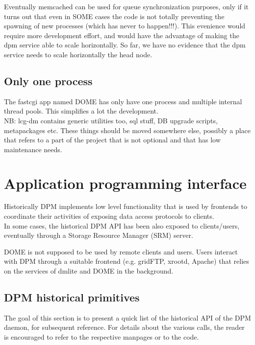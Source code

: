 \documentclass[a4paper,10pt]{scrreprt}
\begin{document}
Eventually memcached can be used for queue synchronization purposes, only if it turns out that even in SOME cases the code is not totally
preventing the spawning of new processes (which has never to happen!!!). This evenience would require more development effort, and would have the
advantage of making the dpm service able to scale horizontally. So far, we have no evidence that the dpm service needs to scale horizontally the head node.\\

\subsection{Only one process}
 The fastcgi app named DOME has only have one process and multiple internal thread pools. This simplifies a lot the development.\\
 
 
 
 
 NB: lcg-dm contains generic utilities too, sql stuff, DB upgrade scripts, metapackages etc. These things should be moved somewhere else,
 possibly a place that refers to a part of the project that is not optional and that has low maintenance needs.\\

 
 
\section{Application programming interface}

Historically DPM implements low level functionality that is used by frontends to coordinate
their activities of exposing data access protocols to clients.\\
In some cases, the historical DPM API has been also exposed to clients/users, eventually through a
Storage Resource Manager (SRM) server.

DOME is not supposed to be used by remote clients and users. Users interact with DPM through a suitable frontend (e.g. gridFTP, xrootd, Apache) that
relies on the services of dmlite and DOME in the background.

\subsection{DPM historical primitives}
 The goal of this section is to present a quick list of the historical API of the DPM daemon, for subsequent reference.
 For details about the various calls, the reader is encouraged to refer to the respective manpages or to the code.
\end{document}
